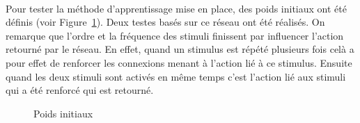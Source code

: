 \paragraph{}
Pour tester la méthode d'apprentissage mise en place, des poids initiaux ont
été définis (voir Figure~\ref{reseau3}). Deux testes basés sur ce réseau ont
été réalisés. On remarque que l'ordre et la fréquence des stimuli finissent par
influencer l'action retourné par le réseau. En effet, quand un stimulus est
répété plusieurs fois celà a pour effet de renforcer les connexions 
menant à l'action lié à ce stimulus. Ensuite quand les deux stimuli sont 
activés en même temps c'est l'action lié aux stimuli qui a été renforcé qui
est retourné.
\begin{figure}[!h]
  \begin{center}
    
  \end{center}
  \caption{Poids initiaux}
  \label{reseau3}
\end{figure}


